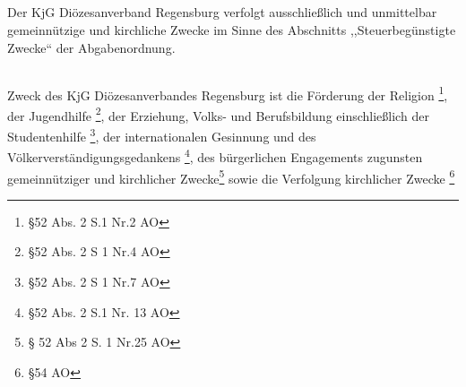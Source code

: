 \documentclass[12pt]{report}
\begin{document}
\begin{flushleft}
\subsection{}
Der KjG Diözesanverband Regensburg verfolgt ausschließlich und unmittelbar gemeinnützige
und kirchliche Zwecke im Sinne des Abschnitts ,,Steuerbegünstigte Zwecke`` der Abgabenordnung.

\subsection{}
\label{sec:Zweck}
Zweck des KjG Diözesanverbandes Regensburg ist die
Förderung der Religion \footnote{§52 Abs. 2 S.1 Nr.2 AO},
der Jugendhilfe \footnote{§52 Abs. 2 S 1 Nr.4 AO},
der Erziehung, Volks- und Berufsbildung einschließlich
der Studentenhilfe \footnote{§52 Abs. 2 S 1 Nr.7 AO}, der internationalen Gesinnung und des
Völkerverständigungsgedankens \footnote{§52 Abs. 2 S.1 Nr. 13 AO}, des bürgerlichen Engagements zugunsten
gemeinnütziger und kirchlicher Zwecke\footnote{§ 52 Abs 2 S. 1 Nr.25 AO}
sowie die Verfolgung kirchlicher Zwecke \footnote{§54 AO}


\end{flushleft}
\end{document}
